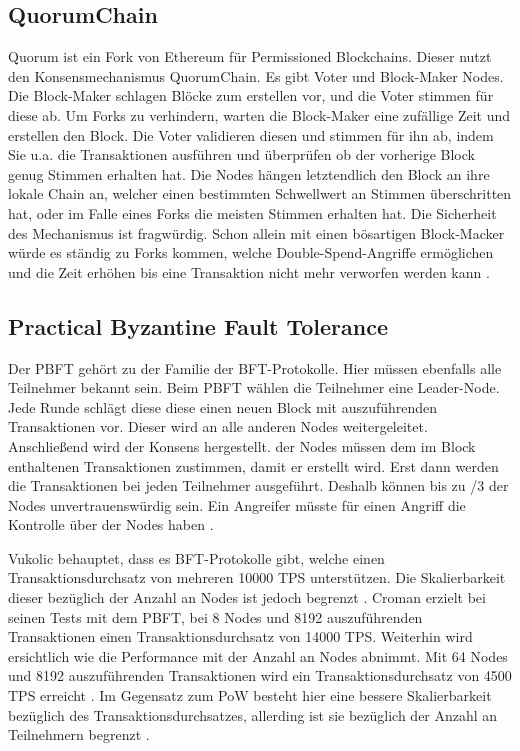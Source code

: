 \subsection{QuorumChain}
Quorum ist ein Fork von Ethereum für Permissioned Blockchains. Dieser nutzt den Konsensmechanismus QuorumChain. Es gibt Voter und Block-Maker Nodes. Die Block-Maker schlagen Blöcke zum erstellen vor, und die Voter stimmen für diese ab. Um Forks zu verhindern, warten die Block-Maker eine zufällige Zeit und erstellen den Block. Die Voter validieren diesen und stimmen für ihn ab, indem Sie u.a. die Transaktionen ausführen und überprüfen ob der vorherige Block genug Stimmen erhalten hat. Die Nodes hängen letztendlich den Block an ihre lokale Chain an, welcher einen bestimmten Schwellwert an Stimmen überschritten hat, oder im Falle eines Forks die meisten Stimmen erhalten hat. Die Sicherheit des Mechanismus ist fragwürdig. Schon allein mit einen bösartigen Block-Macker würde es ständig zu Forks kommen, welche Double-Spend-Angriffe ermöglichen und die Zeit erhöhen bis eine Transaktion nicht mehr verworfen werden kann \cite{CachinBlockchainConsensusProtocols2017}.

\subsection{Practical Byzantine Fault Tolerance}
Der PBFT gehört zu der Familie der BFT-Protokolle. Hier müssen ebenfalls alle Teilnehmer bekannt sein. Beim PBFT wählen die Teilnehmer eine Leader-Node. Jede Runde schlägt diese diese einen neuen Block mit auszuführenden Transaktionen vor. Dieser wird an alle anderen Nodes weitergeleitet. Anschließend wird der Konsens hergestellt.  der Nodes müssen dem im Block enthaltenen Transaktionen zustimmen, damit er erstellt wird. Erst dann werden die Transaktionen bei jeden Teilnehmer ausgeführt. Deshalb können bis zu /3 der Nodes unvertrauenswürdig sein. Ein Angreifer müsste für einen Angriff die Kontrolle über  der Nodes haben \cite{SukhwaniPerformanceModelingPBFT2017a}\cite{ZhengBlockchainChallengesOpportunities2017}. 

Vukolic behauptet, dass es BFT-Protokolle gibt, welche einen Transaktionsdurchsatz von mehreren 10000 TPS unterstützen. Die Skalierbarkeit dieser bezüglich der Anzahl an Nodes ist jedoch begrenzt \cite{Vukolicquestscalableblockchain2015}. Croman erzielt bei seinen Tests mit dem PBFT, bei 8 Nodes und 8192 auszuführenden Transaktionen einen Transaktionsdurchsatz von 14000 TPS. Weiterhin wird ersichtlich wie die Performance mit der Anzahl an Nodes abnimmt. Mit 64 Nodes und 8192 auszuführenden Transaktionen wird ein Transaktionsdurchsatz von 4500 TPS erreicht \cite{CromanScalingDecentralizedBlockchains2016}. Im Gegensatz zum PoW besteht hier eine bessere Skalierbarkeit bezüglich des Transaktionsdurchsatzes, allerding ist sie bezüglich der Anzahl an Teilnehmern begrenzt \cite{Vukolicquestscalableblockchain2015}.

